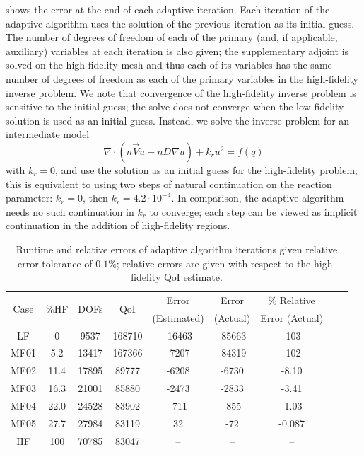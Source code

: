 \documentclass[review,sort&compress]{elsarticle}
\begin{document}
 shows the error at the end of each adaptive iteration. Each iteration of the adaptive algorithm uses the solution of the previous iteration as its initial guess. The number of degrees of freedom of each of the primary (and, if applicable, auxiliary) variables at each iteration is also given; the supplementary adjoint is solved on the high-fidelity mesh and thus each of its variables has the same number of degrees of freedom as each of the primary variables in the high-fidelity inverse problem. We note that convergence of the high-fidelity inverse problem is sensitive to the initial guess; the solve does not converge when the low-fidelity solution is used as an initial guess. Instead, we solve the inverse problem for an intermediate model
%
\begin{equation}
\nabla\cdot(n\vec{V}u - nD\nabla u) + k_ru^2 = f(q)
\end{equation}
%
with $k_r=0$, and use the solution as an initial guess for the high-fidelity problem; this is equivalent to using two steps of natural continuation on the reaction parameter: $k_r=0$, then $k_r=4.2\cdot10^{-4}$. In comparison, the adaptive algorithm needs no such continuation in $k_r$ to converge; each step can be viewed as implicit continuation in the addition of high-fidelity regions.
%
\begin{table}[htbp]
\centering
\begin{tabular}{|c|c|c|c|c|c|c|c|c|}
\hline
\multirow{2}{*}{Case} & \multirow{2}{*}{$\%$HF} & \multirow{2}{*}{DOFs} & \multirow{2}{*}{QoI} & Error & Error & $\%$ Relative \\
& & & & (Estimated) & (Actual) & Error (Actual)  \\ \hline
LF   & 0    & 9537  & 168710 & -16463 & -85663 & -103    \\
MF01 & 5.2  & 13417 & 167366 & -7207  & -84319 & -102    \\
MF02 & 11.4 & 17895 & 89777  & -6208  & -6730  & -8.10   \\
MF03 & 16.3 & 21001 & 85880  & -2473  & -2833  & -3.41   \\
MF04 & 22.0 & 24528 & 83902  & -711   & -855   & -1.03   \\
MF05 & 27.7 & 27984 & 83119  & 32     & -72    & -0.087  \\
HF   & 100  & 70785 & 83047  & --     & --     & --    \\ \hline
\end{tabular}
\caption{Runtime and relative errors of adaptive algorithm iterations given relative error tolerance of $0.1\%$; relative errors are given with respect to the high-fidelity QoI estimate.}
\label{tab:ref3D_diffmesh}
\end{table}
%
\end{document}

